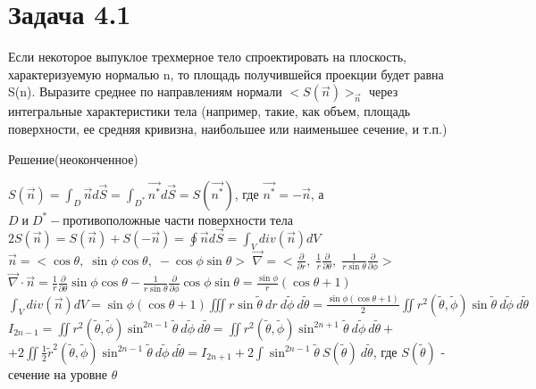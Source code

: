
\usepackage{lineno}

	\section{Задача 4.1}
	Если некоторое выпуклое трехмерное тело спроектировать на плоскость,
	характеризуемую нормалью n, то площадь получившейся проекции будет
	равна S(n). Выразите среднее по направлениям нормали $<S(\vec{n})>_{\vec{n}}$ через интегральные
	характеристики тела (например, такие, как объем, площадь поверхности, ее
	средняя кривизна, наибольшее или наименьшее сечение, и т.п.)
	\newline
	\begin{center}
		Решение(неоконченное)
	\end{center}
	\linenumbers
	$S(\vec{n}) = \int_{D}^{} \vec{n} d\vec{S} = \int_{D^{*}}^{} \vec{n^{*}} d\vec{S} = S(\vec{n^{*}})$, где $\vec{n^{*}} = -\vec{n} $, 
	\newline
	а $D \; \text{и} \; D^{*} - \text{противоположные части поверхности тела}$
	\newline
	$2S(\vec{n}) = S(\vec{n})+S(-\vec{n}) = \oint \vec{n} d\vec{S} = \int_{V}^{} div(\vec{n}) dV$ 
	\newline
	$\vec{n} = <\cos\theta, \; \sin\phi \cos\theta, \; -\cos\phi \sin\theta> $
	\newline
	$\vec{\nabla} = <\frac{\partial}{\partial r}, \; \frac{1}{r} \frac{\partial}{\partial \theta}, \; \frac{1}{r\sin\theta} \frac{\partial}{\partial \phi}>$
	\newline
	$\vec{\nabla} \cdot \vec{n} = \frac{1}{r} \frac{\partial}{\partial \theta} \sin\phi \cos\theta - \frac{1}{r\sin\theta} \frac{\partial}{\partial \phi} \cos\phi \sin\theta = \frac{\sin \phi}{r} (\cos \theta +1) $
	\newline
	$\int_{V}^{} div(\vec{n}) dV = \sin \phi (\cos \theta +1) \iiint r \sin \tilde \theta \: dr \: d \tilde{\phi} \: d \tilde{\theta} = \frac{\sin \phi (\cos \theta +1)}{2} \iint r^2(\tilde \theta , \tilde{\phi}) \sin \tilde \theta \: d \tilde{\phi} \: d \tilde{\theta}$
	\newline
	$I_{2n-1} = \iint r^2(\tilde \theta , \tilde{\phi}) \sin^{2n-1} \tilde \theta \: d \tilde{\phi} \: d \tilde{\theta} = \iint r^2(\tilde \theta , \tilde{\phi}) \sin^{2n+1} \tilde \theta \: d \tilde{\phi} \: d \tilde{\theta} +$
	\newline
	$+2 \iint \frac{1}{2}\tilde{r}^2(\tilde \theta , \tilde{\phi}) \sin^{2n-1} \tilde \theta \: d \tilde{\phi} \: d \tilde{\theta} = I_{2n+1} + 2 \int \sin^{2n-1} \tilde \theta \: S(\tilde \theta)  \: d \tilde{\theta}$, где $S(\tilde \theta)$ - сечение на уровне $\theta$
